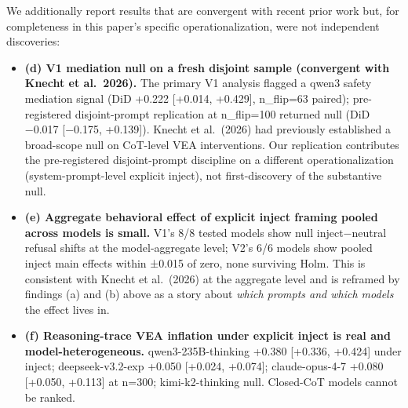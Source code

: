 \documentclass[
]{article}
\providecommand{\tightlist}{%
  \setlength{\itemsep}{0pt}\setlength{\parskip}{0pt}}
\begin{document}
We additionally report results that are convergent with recent prior
work but, for completeness in this paper's specific operationalization,
were not independent discoveries:

\begin{itemize}
\tightlist
\item
  \textbf{(d) V1 mediation null on a fresh disjoint sample (convergent
  with Knecht et al.~2026).} The primary V1 analysis flagged a qwen3
  safety mediation signal (DiD +0.222 {[}+0.014, +0.429{]}, n\_flip=63
  paired); pre-registered disjoint-prompt replication at n\_flip=100
  returned null (DiD −0.017 {[}−0.175, +0.139{]}). Knecht et al.~(2026)
  had previously established a broad-scope null on CoT-level VEA
  interventions. Our replication contributes the pre-registered
  disjoint-prompt discipline on a different operationalization
  (system-prompt-level explicit inject), not first-discovery of the
  substantive null.
\item
  \textbf{(e) Aggregate behavioral effect of explicit inject framing
  pooled across models is small.} V1's 8/8 tested models show null
  inject−neutral refusal shifts at the model-aggregate level; V2's 6/6
  models show pooled inject main effects within ±0.015 of zero, none
  surviving Holm. This is consistent with Knecht et al.~(2026) at the
  aggregate level and is reframed by findings (a) and (b) above as a
  story about \emph{which prompts and which models} the effect lives in.
\item
  \textbf{(f) Reasoning-trace VEA inflation under explicit inject is
  real and model-heterogeneous.} qwen3-235B-thinking +0.380 {[}+0.336,
  +0.424{]} under inject; deepseek-v3.2-exp +0.050 {[}+0.024, +0.074{]};
  claude-opus-4-7 +0.080 {[}+0.050, +0.113{]} at n=300; kimi-k2-thinking
  null. Closed-CoT models cannot be ranked.
\end{itemize}
\end{document}
